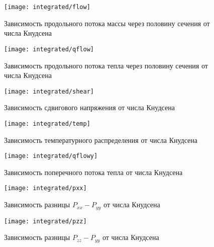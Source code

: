 \documentclass[a4paper,12pt]{article}
\begin{document}
\begin{figure}
    \centering
    \texttt{[image: integrated/flow]}
    \caption{Зависимость продольного потока массы через половину сечения от числа Кнудсена}
    \label{fig:flow}
\end{figure}

\begin{figure}
    \centering
    \texttt{[image: integrated/qflow]}
    \caption{Зависимость продольного потока тепла через половину сечения от числа Кнудсена}
    \label{fig:qflow}
\end{figure}

\begin{figure}
    \centering
    \texttt{[image: integrated/shear]}
    \caption{Зависимость сдвигового напряжения от числа Кнудсена}
    \label{fig:shear}
\end{figure}

\begin{figure}
    \centering
    \texttt{[image: integrated/temp]}
    \caption{Зависимость температурного распределения от числа Кнудсена}
    \label{fig:temp}
\end{figure}

\begin{figure}
    \centering
    \texttt{[image: integrated/qflowy]}
    \caption{Зависимость поперечного потока тепла от числа Кнудсена}
    \label{fig:qflowy}
\end{figure}

\begin{figure}
    \centering
    \texttt{[image: integrated/pxx]}
    \caption{Зависимость разницы \(P_{xx}-P_{yy}\)  от числа Кнудсена}
    \label{fig:pxx}
\end{figure}

\begin{figure}
    \centering
    \texttt{[image: integrated/pzz]}
    \caption{Зависимость разницы \(P_{zz}-P_{yy}\) от числа Кнудсена}
    \label{fig:pzz}
\end{figure}

\appendix
\appendixpage



\printbibliography
\end{document}
